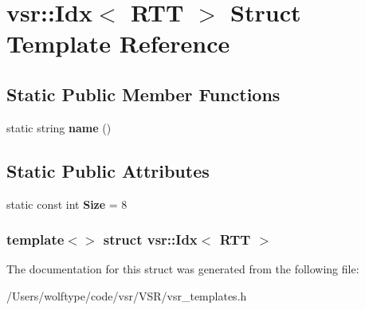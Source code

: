 \hypertarget{structvsr_1_1_idx_3_01_r_t_t_01_4}{\section{vsr\-:\-:Idx$<$ R\-T\-T $>$ Struct Template Reference}
\label{structvsr_1_1_idx_3_01_r_t_t_01_4}
}
\subsection*{Static Public Member Functions}
\begin{DoxyCompactItemize}
\item 
\hypertarget{structvsr_1_1_idx_3_01_r_t_t_01_4_a639f9fe3149aac189f66777d8dc55552}{static string {\bfseries name} ()}\label{structvsr_1_1_idx_3_01_r_t_t_01_4_a639f9fe3149aac189f66777d8dc55552}

\end{DoxyCompactItemize}
\subsection*{Static Public Attributes}
\begin{DoxyCompactItemize}
\item 
\hypertarget{structvsr_1_1_idx_3_01_r_t_t_01_4_a49c16cc406efa8c8fe687d2afd93d11b}{static const int {\bfseries Size} = 8}\label{structvsr_1_1_idx_3_01_r_t_t_01_4_a49c16cc406efa8c8fe687d2afd93d11b}

\end{DoxyCompactItemize}
\subsubsection*{template$<$$>$ struct vsr\-::\-Idx$<$ R\-T\-T $>$}



The documentation for this struct was generated from the following file\-:\begin{DoxyCompactItemize}
\item 
/\-Users/wolftype/code/vsr/\-V\-S\-R/vsr\-\_\-templates.\-h\end{DoxyCompactItemize}
